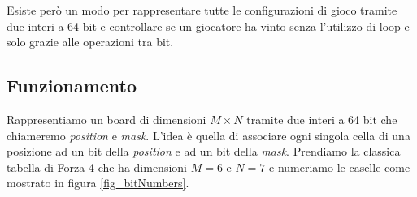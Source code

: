 \documentclass[a4paper]{article}
\begin{document}
Esiste però un modo per rappresentare tutte le configurazioni di gioco tramite
due interi a 64 bit e controllare se un giocatore ha vinto senza l'utilizzo di
loop e solo grazie alle operazioni tra bit.

\subsection{Funzionamento}
Rappresentiamo un board di dimensioni $M \times N$ tramite due interi a 64 bit
che chiameremo \emph{position} e \emph{mask}. L'idea è quella di associare ogni
singola cella di una posizione ad un bit della \emph{position} e ad un bit della
\emph{mask}. Prendiamo la classica tabella di Forza 4 che ha dimensioni $M = 6$ 
e $N = 7$ e numeriamo le caselle come mostrato in figura \ref{fig_bitNumbers}.
\end{document}
